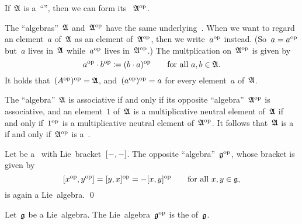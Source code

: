 \begin{recall}
	If~$\mathfrak{A}$ is a~\enquote{\algebra{$\kf$}}, then we can form its ~$\mathfrak{A}^{\mathrm{op}}$.

	The \enquote{algebras}~$\mathfrak{A}$ and~$\mathfrak{A}^{\mathrm{op}}$ have the same underlying~\vectorspace{$\kf$}.
	When we want to regard an element~$a$ of~$\mathfrak{A}$ as an element of~$\mathfrak{A}^{\mathrm{op}}$, then we write~$a^{\mathrm{op}}$ instead.
	(So~$a = a^{\mathrm{op}}$ but~$a$ lives in~$\mathfrak{A}$ while~$a^{\mathrm{op}}$ lives in~$\mathfrak{A}^{\mathrm{op}}$.)
	The multplication on~$\mathfrak{A}^{\mathrm{op}}$ is given by
	\[
		a^{\mathrm{op}} \cdot b^{\mathrm{op}}
		\coloneqq
		(b \cdot a)^{\mathrm{op}}
		\qquad
		\text{for all~$a, b \in \mathfrak{A}$.}
	\]
	It holds that~$(A^{\mathrm{op}})^{\mathrm{op}} = \mathfrak{A}$, and~$(a^{\mathrm{op}})^{\mathrm{op}} = a$ for every element~$a$ of~$\mathfrak{A}$.

	The \enquote{algebra}~$\mathfrak{A}$ is associative if and only if its opposite \enquote{algebra}~$\mathfrak{A}^{\mathrm{op}}$ is associative, and an element~$1$ of~$\mathfrak{A}$ is a multiplicative neutral element of~$\mathfrak{A}$ if and only if~$1^{\mathrm{op}}$ is a multiplicative neutral element of~$\mathfrak{A}^{\mathrm{op}}$.
	It follows that~$\mathfrak{A}$ is a~\algebra{$\kf$} if and only if~$\mathfrak{A}^{\mathrm{op}}$ is a~\algebra{$\kf$}.
\end{recall}


\begin{proposition}
	Let be a~\liealgebra{$\kf$} with Lie~bracket~$[-, -]$.
	The opposite \enquote{algebra}~$\mathfrak{g}^{\mathrm{op}}$, whose bracket is given by
	\[
		[x^{\mathrm{op}}, y^{\mathrm{op}}]
		=
		[y,x]^{\mathrm{op}}
		=
		-[x,y]^{\mathrm{op}}
		\qquad
		\text{for all~$x, y \in \mathfrak{g}$,}
	\]
	is again a Lie~algebra.
	\qed
\end{proposition}


\begin{definition}
	Let~$\mathfrak{g}$ be a Lie~algebra.
	The Lie~algebra~$\mathfrak{g}^{\mathrm{op}}$ is the  of~$\mathfrak{g}$.
\end{definition}





